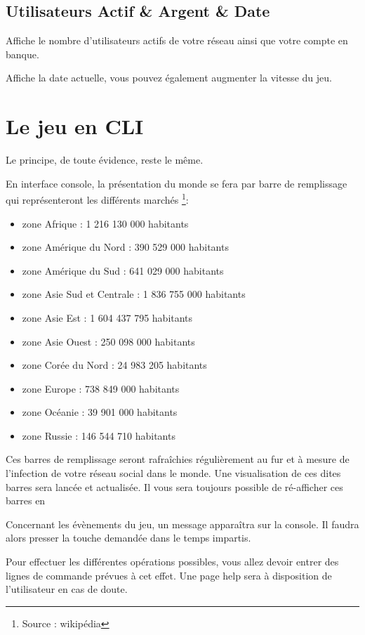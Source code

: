 \subsection{Utilisateurs Actif \& Argent \& Date}
Affiche le nombre d'utilisateurs actifs de votre réseau ainsi que votre compte en banque.

Affiche la date actuelle, vous pouvez également augmenter la vitesse du jeu.

\section{Le jeu en CLI}
Le principe, de toute évidence, reste le même.

En interface console, la présentation du monde se fera par barre de remplissage qui représenteront les différents marchés \footnote{Source : wikipédia}: 
    \begin{itemize}
                \item zone Afrique : 1 216 130 000 habitants
                \item zone Amérique du Nord : 390 529 000 habitants
                \item zone Amérique du Sud : 641 029 000 habitants
                \item zone Asie Sud et Centrale : 1 836 755 000 habitants
                \item zone Asie Est : 1 604 437 795 habitants
                \item zone Asie Ouest : 250 098 000 habitants
                \item zone Corée du Nord : 24 983 205 habitants
                \item zone Europe : 738 849 000 habitants
                \item zone Océanie : 39 901 000 habitants
                \item zone Russie : 146 544  710 habitants
    \end{itemize}

Ces barres de remplissage seront rafraîchies régulièrement au fur et à mesure de l'infection de votre réseau social dans le monde. Une visualisation de ces dites barres sera lancée et actualisée. Il vous sera toujours possible de ré-afficher ces barres en 

Concernant les évènements du jeu, un message apparaîtra sur la console. Il faudra alors presser la touche demandée dans le temps impartis.

Pour effectuer les différentes opérations possibles, vous allez devoir entrer des lignes de commande prévues à cet effet. Une page help sera à disposition de l'utilisateur en cas de doute. 

